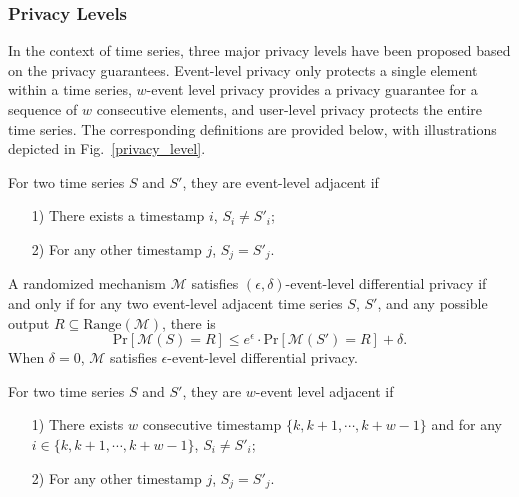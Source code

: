 \subsubsection{Privacy Levels}
In the context of time series, three major privacy levels have been proposed based on the privacy guarantees. Event-level privacy only protects a single element within a time series, $w$-event level privacy provides a privacy guarantee for a sequence of $w$ consecutive elements, and user-level privacy protects the entire time series. The corresponding definitions are provided below, with illustrations depicted in Fig.~\ref{privacy_level}.

\begin{definition}
	For two time series $S$ and $S'$, they are event-level adjacent if
	\begin{enumerate}
		\item [1)] There exists a timestamp $i$, $S_i\ne S'_i$;
		\item [2)] For any other timestamp $j$,  $S_j= S'_j.$
	\end{enumerate}
\end{definition}

\begin{definition} A randomized mechanism $\mathcal{M}$ satisfies $(\epsilon, \delta)$-event-level differential privacy if and only if for any two event-level adjacent time series $S$, $S'$, and any possible output $R\subseteq\mathrm{Range}(\mathcal{M})$, there is
	\begin{equation}
		\mathrm{Pr}[\mathcal{M}(S)=R]\le e^\epsilon\cdot \mathrm{Pr}[\mathcal{M}(S')=R]+\delta.\nonumber
	\end{equation}
	When $\delta=0$, $\mathcal{M}$ satisfies $\epsilon$-event-level differential privacy.
\end{definition}

\begin{definition}
	For two time series $S$ and $S'$, they are  $w$-event level adjacent if
	\begin{enumerate}
		\item [1)] There exists $w$ consecutive timestamp $\{k, k+1, \cdots, k+w-1\}$ and for any $i \in \{k, k+1, \cdots, k+w-1\}$, $S_i\ne S'_i$;
		\item [2)] For any other timestamp $j$,  $S_j= S'_j.$
	\end{enumerate}
\end{definition}

